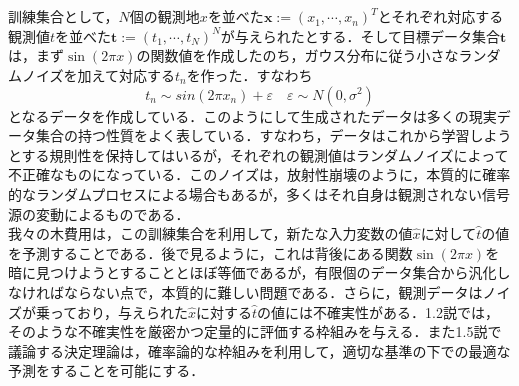 \documentclass{jsarticle}
\theoremstyle{definition}
\numberwithin{equation}{section}
\begin{document}
\large

\section{}
\subsection{}訓練集合として，$N$個の観測地$x$を並べた${\bm x}:=(x_1,\cdots,x_n)^T $とそれぞれ対応する観測値$t$を並べた${\bm t}:= (t_1,\cdots,t_N)^N$が与えられたとする．そして目標データ集合${\bm t}$は，まず$\sin(2\pi x)$の関数値を作成したのち，ガウス分布に従う小さなランダムノイズを加えて対応する$t_n$を作った．すなわち
$$t_n \sim sin(2\pi x_n) + \varepsilon \quad \varepsilon \sim N(0,\sigma^2)$$
となるデータを作成している．このようにして生成されたデータは多くの現実データ集合の持つ性質をよく表している．すなわち，データはこれから学習しようとする規則性を保持してはいるが，それぞれの観測値はランダムノイズによって不正確なものになっている．このノイズは，放射性崩壊のように，本質的に確率的なランダムプロセスによる場合もあるが，多くはそれ自身は観測されない信号源の変動によるものである．\\

我々の木費用は，この訓練集合を利用して，新たな入力変数の値$\hat{x}$に対して$\hat{t}$の値を予測することである．後で見るように，これは背後にある関数$\sin (2\pi x)$を暗に見つけようとすることとほぼ等価であるが，有限個のデータ集合から汎化しなければならない点で，本質的に難しい問題である．さらに，観測データはノイズが乗っており，与えられた$\hat{x}$に対する$\hat t$の値には不確実性がある．1.2説では，そのような不確実性を厳密かつ定量的に評価する枠組みを与える．また1.5説で議論する決定理論は，確率論的な枠組みを利用して，適切な基準の下での最適な予測をすることを可能にする．\\
\end{document}
